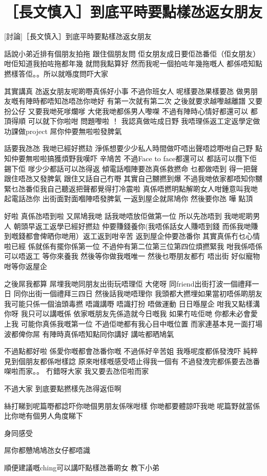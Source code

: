 \chapter{［長文慎入］到底平時要點樣氹返女朋友}

[討論]［長文慎入］到底平時要點樣氹返女朋友

話說小弟近排有個朋友拍拖 跟住個朋友問 佢女朋友成日要佢氹番佢（佢女朋友） 咁佢知道我拍咗拖都年幾 就問我點算好 然而我呢一個拍咗年幾拖嘅人 都係唔知點撚樣答佢。。所以就喺度問吓大家

其實講真 氹返女朋友呢啲嘢真係好小事 不過你班女人 呢樣要氹果樣要氹 做男朋友嘅有陣時都唔知氹唔氹你哋好 有第一次就有第二次 之後就要求越嚟越離譜 又要扮公仔 又要我哋死嗲爛嗲 大佬我哋都係男人嚟㗎 不過有陣時心情好都還可以 都頂得順 可以就下你啦咁 問題嚟啦 ！ 我認真做咗成日野 我唔理係返工定返學定做功課做project 屌你仲要無啦啦發脾氣

話要我氹氹 我哋已經好撚攰 淨係想要少少私人時間做吓唔出聲唔諗嘢咁自己野 點知仲要無啦啦搞獲煩野我嘆吓 辛鳩苦 不過Face to face都還可以 都話可以攬下佢 錫下佢 嗲少少都話可以氹得返 傾電話嗰陣要氹真係救撚命 乜都做唔到 得一把聲 跟住唔氹又發脾氣 跟住又話自己冇嘢 其實自己嬲撚到爆 不過我哋依家都唔知你嬲緊乜氹番佢我自己聽返把聲都覺得打冷震啦 真係唔撚明點解啲女人咁鍾意叫我哋起電話氹你 出街面對面嗰陣唔發脾氣 一返到屋企就屌鳩你 然後要你氹 嘩 點頂

好啦 真係氹唔到啦 又屌鳩我哋 話我哋唔放佢做第一位 所以先氹唔到 我哋呢啲男人 朝頭早返工返學已經好撚攰 仲要賺錢養你(我唔係話女人賺唔到錢 而係我哋賺到嘅錢都會俾晒你哋用）返工返到咁辛苦 返到屋企仲要氹番你 其實真係冇乜心情啦已經 係就係有擺你係第一位 不過仲有第二位第三位第四位煩撚緊我 咁我係唔係可以唔返工 等你來養我 然後等你做我嘅唯一 然後乜嘢朋友都冇 唔出街 好似寵物咁等你返屋企

之後屌我都算 屌埋我哋同朋友出街玩唔理佢 大佬呀 同friend出街打波一個禮拜一日 同你出街一個禮拜三四日 然後話我哋唔理你 我頭都大撚埋如果當初唔係啲朋友 我可能只係一個油頭毒撚 唔識講嘢 唔識打扮 唔做運動 日日喺屋企 咁我又點樣溝你呀 我只可以講嘅係 依家嘅朋友先係造就今日嘅我 如果冇咗佢哋 你都未必會愛上我 可能你真係我嘅第一位 不過佢哋都有我心目中嘅位置 而家連基本見一面打場波都俾你屌 有陣時真係唔知點同你講好 講咗都晒鳩氣

不過點都好啦 係愛你嘅都會氹番你嘅 不過係好辛苦姐 我喺呢度都係發洩吓 純粹見到個朋友都係咁樣諗 原來咁樣嘅感受唔止得我一個有 不過發洩完都係要去氹番㗎啦而家。。 冇錯呀大家 我又要去氹佢啦而家

不過大家 到底要點撚樣先氹得返佢啊

絲打睇到呢篇嘢都諗吓你哋個男朋友係咪咁樣 你哋都要體諒吓我哋 呢篇野就當係比你哋有個男人角度睇下

身同感受

屌你都戇鳩鳩氹女仔都唔識

順便建議嘅ching可以講吓點樣氹番啲女 教下小弟

